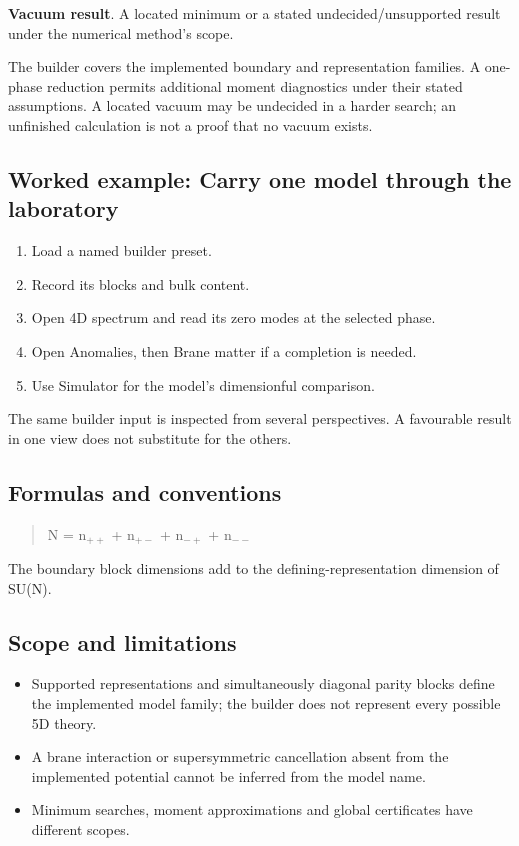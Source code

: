 \documentclass[11pt,a4paper]{article}
\begin{document}
\textbf{Vacuum result}. A located minimum or a stated undecided/unsupported result under the numerical method's scope.

The builder covers the implemented boundary and representation families. A one-phase reduction permits additional moment diagnostics under their stated assumptions. A located vacuum may be undecided in a harder search; an unfinished calculation is not a proof that no vacuum exists.
\subsection*{Worked example: Carry one model through the laboratory}
\begin{enumerate}
\item Load a named builder preset.
\item Record its blocks and bulk content.
\item Open 4D spectrum and read its zero modes at the selected phase.
\item Open Anomalies, then Brane matter if a completion is needed.
\item Use Simulator for the model's dimensionful comparison.
\end{enumerate}
The same builder input is inspected from several perspectives. A favourable result in one view does not substitute for the others.
\subsection*{Formulas and conventions}
\begin{quote}N = n\ensuremath{{}_{++}} + n\ensuremath{{}_{+-}} + n\ensuremath{{}_{-+}} + n\ensuremath{{}_{--}}\end{quote}
The boundary block dimensions add to the defining-representation dimension of SU(N).

\subsection*{Scope and limitations}
\begin{itemize}
\item Supported representations and simultaneously diagonal parity blocks define the implemented model family; the builder does not represent every possible 5D theory.
\item A brane interaction or supersymmetric cancellation absent from the implemented potential cannot be inferred from the model name.
\item Minimum searches, moment approximations and global certificates have different scopes.
\end{itemize}
\end{document}
